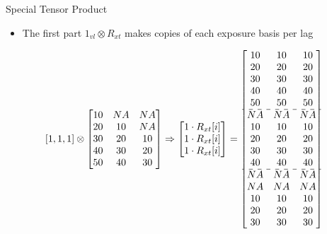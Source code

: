 \documentclass[english]{beamer}
\begin{document}
\begin{frame}{Special Tensor Product}
\begin{itemize}
    \item The first part \(1_{vl} \otimes R_{xt}\) makes copies of each exposure basis per lag 
\end{itemize}
\footnotesize
\[ 
[1,1,1] \otimes \begin{bmatrix}
10 & NA & NA \\
20 & 10 & NA \\
30 & 20 & 10 \\
40 & 30 & 20 \\
50 & 40 & 30
\end{bmatrix} \Rightarrow
\begin{bmatrix} 
1 \cdot R_{xt}[i] \\ 
1 \cdot R_{xt}[i] \\ 
1 \cdot R_{xt}[i] 
\end{bmatrix}
=\begin{bmatrix}
10 & 10 & 10 \\
20 & 20 & 20 \\
30 & 30 & 30 \\
40 & 40 & 40 \\
50 & 50 & 50 \\ \hdashline
NA & NA & NA \\
10 & 10 & 10 \\
20 & 20 & 20 \\
30 & 30 & 30 \\
40 & 40 & 40 \\ \hdashline
NA & NA & NA \\
NA & NA& NA \\
10 & 10 & 10 \\
20 & 20 & 20 \\
30 & 30 & 30 \\ 
\end{bmatrix}
\]
\end{frame}
\end{document}
